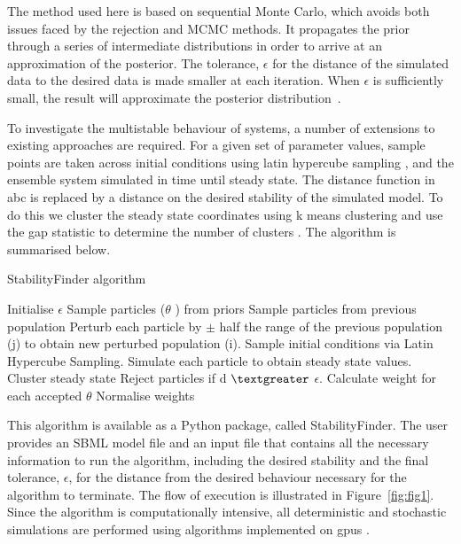 The method used here is based on sequential Monte Carlo, which avoids both issues faced by the rejection and MCMC methods. It propagates the prior through a series of intermediate distributions in order to arrive at an approximation of the posterior. The tolerance, $\epsilon$ for the distance of the simulated data to the desired data is made smaller at each iteration. When $\epsilon$ is sufficiently small, the result will approximate the posterior distribution~\autocite{Toni:2009tr}.  
\par
To investigate the multistable behaviour of systems, a number of extensions to existing approaches are required. For a given set of parameter values, sample points are taken across initial conditions using latin hypercube sampling \autocite{XXX}, and the ensemble system simulated in time until steady state. The distance function in \acrshort{abc} is replaced by a distance on the desired stability of the simulated model. To do this we cluster the steady state coordinates using k means clustering and use the gap statistic to determine the number of clusters \autocite{XXX}. The algorithm is summarised below.
\begin{algorithm}[H]
\label{alg:StabilityFinder}
\caption{StabilityFinder algorithm}
 \begin{algorithmic}[1]
    \Statex
	\State Initialise $\epsilon$ 
		\State Sample particles ($\theta$ ) from priors
		\Else
			\State Sample particles from previous population
			\State Perturb each particle by $\pm$ half the range of the previous population (j) to obtain new perturbed population (i).
	\EndIf
	\State Sample initial conditions via Latin Hypercube Sampling.
    \State Simulate each particle to obtain steady state values.
    \State Cluster steady state
	\State Reject particles if d $\textgreater$ $\epsilon$.
    \State Calculate weight for each accepted $\theta$
	\State Normalise weights
	 
  \end{algorithmic} 
\end{algorithm}
\noindent This algorithm is available as a Python package, called StabilityFinder. %
The user provides an SBML model file \autocite{XXX} and an input file that contains all the necessary information to run the algorithm, including the desired stability and the final tolerance, $\epsilon$, for the distance from the desired behaviour necessary for the algorithm to terminate. The flow of execution is illustrated in Figure~\ref{fig:fig1}. Since the algorithm is computationally intensive, all deterministic and stochastic simulations are performed using algorithms implemented on \acrfull{gpu}s \autocite{XXX}.

